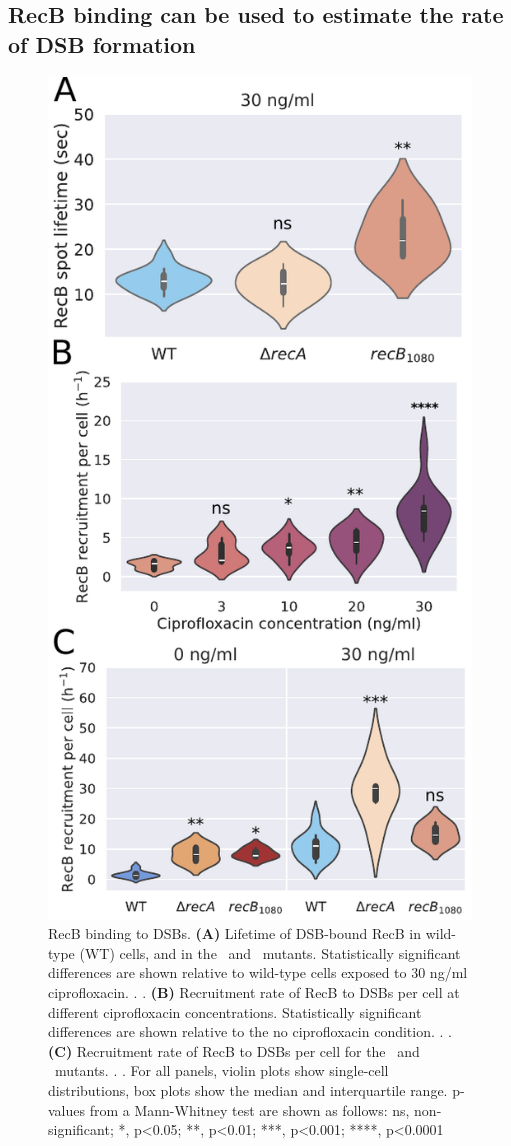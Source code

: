 \subsection*{RecB binding can be used to estimate the rate of DSB formation}

\begin{figure}[htbp]
    \centering
    \includegraphics[width=.48\textwidth]{Figures/Fig3_RecB_recruitment.pdf}
    \caption{RecB binding to DSBs. \textbf{(A)} Lifetime of DSB-bound RecB in wild-type (WT) cells, and in the \dreca\ and \geneteneighty\ mutants. Statistically significant differences are shown relative to wild-type cells exposed to 30 ng/ml ciprofloxacin. \ncells{}. \nspots{}. \textbf{(B)} Recruitment rate of RecB to DSBs per cell at different ciprofloxacin concentrations. Statistically significant differences are shown relative to the no ciprofloxacin condition. . . \textbf{(C)} Recruitment rate of RecB to DSBs per cell for the \dreca\ and \geneteneighty\ mutants. . . For all panels, violin plots show single-cell distributions, box plots show the median and interquartile range. p-values from a Mann-Whitney test are shown as follows: ns, non-significant; *, p<0.05; **, p<0.01; ***, p<0.001; ****, p<0.0001}
    \label{Fig:recruitment}
\end{figure}

